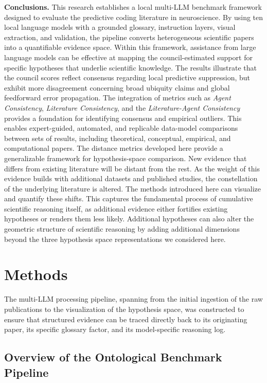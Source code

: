 \documentclass[12pt]{article}
\begin{document}
\noindent\textbf{Conclusions.} This research establishes a local multi-LLM benchmark framework designed to evaluate the predictive coding literature in neuroscience. By using ten local language models with a grounded glossary, instruction layers, visual extraction, and validation, the pipeline converts heterogeneous scientific papers into a quantifiable evidence space. Within this framework, assistance from large language models can be effective at mapping the council-estimated support for specific hypotheses that underlie scientific knowledge. The results illustrate that the council scores reflect consensus regarding local predictive suppression, but exhibit more disagreement concerning broad ubiquity claims and global feedforward error propagation. The integration of metrics such as \emph{Agent Consistency}, \emph{Literature Consistency}, and the \emph{Literature-Agent Consistency} provides a foundation for identifying consensus and empirical outliers. This enables expert-guided, automated, and replicable data-model comparisons between sets of results, including theoretical, conceptual, empirical, and computational papers. The distance metrics developed here provide a generalizable framework for hypothesis-space comparison. New evidence that differs from existing literature will be distant from the rest. As the weight of this evidence builds with additional datasets and published studies, the constellation of the underlying literature is altered. The methods introduced here can visualize and quantify these shifts. This captures the fundamental process of cumulative scientific reasoning itself, as additional evidence either fortifies existing hypotheses or renders them less likely. Additional hypotheses can also alter the geometric structure of scientific reasoning by adding additional dimensions beyond the three hypothesis space representations we considered here.


\section{Methods}\label{methods}

The multi-LLM processing pipeline, spanning from the initial ingestion of the raw publications to the visualization of the hypothesis space, was constructed to ensure that structured evidence can be traced directly back to its originating paper, its specific glossary factor, and its model-specific reasoning log.

\subsection{Overview of the Ontological Benchmark Pipeline}\label{overview-of-the-ontological-benchmark-pipeline}
\end{document}
